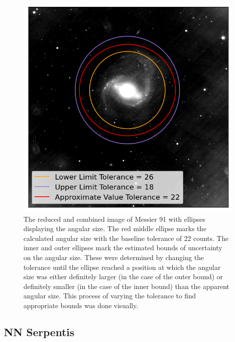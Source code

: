 \documentclass[%
reprint,
amsmath,amssymb,
aps,
]{revtex4-2}
\begin{document}
			\begin{figure}
				\includegraphics[width=\columnwidth]{angularSize.png}
				\caption{\label{fig:angSize} The reduced and combined image of Messier 91 with ellipses displaying the angular size. The red middle ellipse marks the calculated angular size with the baseline tolerance of 22 counts. The inner and outer ellipses mark the estimated bounds of uncertainty on the angular size. These were determined by changing the tolerance until the ellipse reached a position at which the angular size was either definitely larger (in the case of the outer bound) or definitely smaller (in the case of the inner bound) than the apparent angular size. This process of varying the tolerance to find appropriate bounds was done visually.}
			\end{figure}
			
		
		\subsection{NN Serpentis}
		
\end{document}
